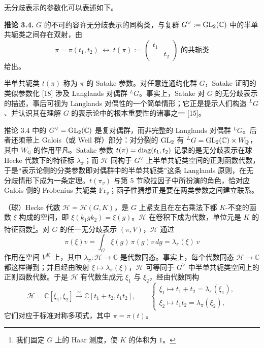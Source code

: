 无分歧表示的参数化可以表述如下。

\medskip\noindent\textbf{推论 3.4.}\quad
$G$ 的不可约容许无分歧表示的同构类，与复群 $G^\vee:=\mathrm{GL}_2(\mathbb{C})$ 中的半单共轭类之间存在双射，由
\[
\pi=\pi(t_1,t_2)\ \longleftrightarrow\ t(\pi):=\text{$\begin{pmatrix}t_1&\\&t_2\end{pmatrix}$ 的共轭类}
\]
给出。

\medskip
半单共轭类 $t(\pi)$ 称为 $\pi$ 的 Satake 参数。对任意连通约化群 $G$，Satake 证明的类似参数化 [18] 涉及 Langlands 对偶群 $^{L}G$。事实上，Satake 对 $G$ 的无分歧表示的描述，事后可视为 Langlands 对偶性的一个简单情形；它正是提示人们构造 $^{L}G$、并认识其在理解 $G$ 的表示论中的根本重要性的诸事之一 [15]。

\begin{annote}
推论 3.4 中的 $G^\vee=\mathrm{GL}_2(\mathbb{C})$ 是复对偶群，而非完整的 Langlands 对偶群 $^{L}G$。后者还须带上 Galois（或 Weil 群）部分：对分裂的 $\mathrm{GL}_2$ 有 $^{L}G=\mathrm{GL}_2(\mathbb{C})\times W_\mathbb{Q}$，其中 $W_\mathbb{Q}$ 的作用平凡。Satake 参数 $t(\pi)=\operatorname{diag}(t_1,t_2)$ 记录的是无分歧表示在球 Hecke 代数下的特征标 $\lambda_\pi$；而 $\mathcal{H}$ 同构于 $G^\vee$ 上半单共轭类空间的正则函数代数，于是“表示论侧的分类参数即对偶群中的半单共轭类”这条 Langlands 原则，在无分歧情形下成为一条定理。$t(\pi_v)$ 与第 5 节欧拉因子中所扮演的角色，恰对应 Galois 侧的 Frobenius 共轭类 $\mathrm{Fr}_v$；函子性猜想正是要在两类参数之间建立联系。

\par{}
\end{annote}

（球）Hecke 代数 $\mathcal{H}=\mathcal{H}(G,K)$，是 $G$ 上紧支且在左右乘法下都 $K$-不变的函数 $\xi$ 构成的空间，即 $\xi(k_1gk_2)=\xi(g)$。$\mathcal{H}$ 在卷积下成为代数，单位元是 $K$ 的特征函数\footnote{我们固定 $G$ 上的 Haar 测度，使 $K$ 的体积为 $1$。}。对 $G$ 的任一无分歧表示 $(\pi,V)$，$\mathcal{H}$ 通过
\[
\pi(\xi)v=\int_G\xi(g)\,\pi(g)v\,dg=\lambda_\pi(\xi)\,v
\]
作用在空间 $V^K$ 上，其中 $\lambda_\pi:\mathcal{H}\to\mathbb{C}$ 是代数同态。事实上，每个代数同态 $\mathcal{H}\to\mathbb{C}$ 都这样得到；并且经由映射 $\xi\mapsto\lambda_\pi(\xi)$，$\mathcal{H}$ 可等同于 $G^\vee$ 中半单共轭类空间上的正则函数代数。于是 $\mathcal{H}$ 有代数生成元 $\xi_1$ 与 $\xi_2$，经由代数同构
\[
\mathcal{H}=\mathbb{C}[\xi_1,\xi_2]\overset{\sim}{\longrightarrow}\mathbb{C}[t_1+t_2,t_1t_2],
\qquad
\begin{cases}
\xi_1\mapsto t_1+t_2=\lambda_\pi(\xi_1),\\[2pt]
\xi_2\mapsto t_1t_2=\lambda_\pi(\xi_2),
\end{cases}
\]
它们对应于标准对称多项式，其中 $\pi=\pi(t)$。

